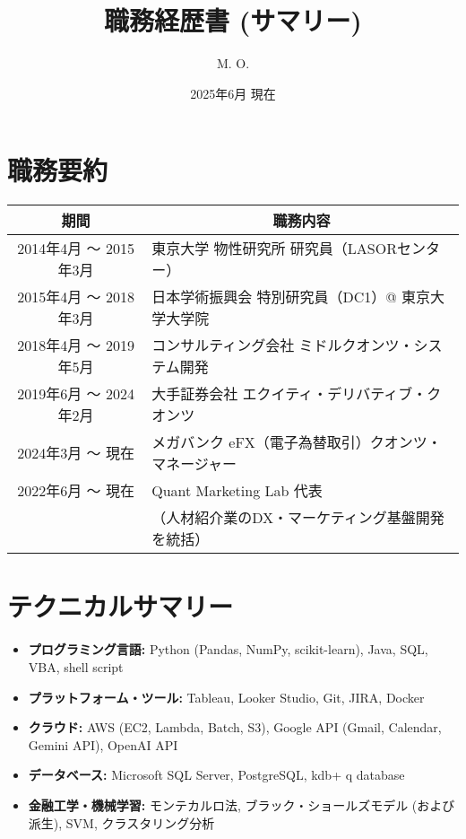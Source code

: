 \documentclass[uplatex,a4j,10.5pt,dvipdfmx]{jsarticle}
\title{\sffamily \bfseries 職務経歴書 (サマリー)}
\author{M. O.}
\date{2025年6月 現在}
\begin{document}
\maketitle

\section{職務要約}

\begin{longtable}{|c|p{14cm}|}
	\hline
	\multicolumn{1}{|c|}{\textbf{期間}} & \multicolumn{1}{c|}{\textbf{職務内容}} \\
	\hline
	\endhead

	\hline
	2014年4月 ～ 2015年3月                 & 東京大学 物性研究所 研究員（LASORセンター）          \\
	\hline
	2015年4月 ～ 2018年3月                 & 日本学術振興会 特別研究員（DC1）@ 東京大学大学院        \\
	\hline
	2018年4月 ～ 2019年5月                 & コンサルティング会社 ミドルクオンツ・システム開発          \\
	\hline
	2019年6月 ～ 2024年2月                 & 大手証券会社 エクイティ・デリバティブ・クオンツ           \\
	\hline
	2024年3月 ～ 現在                      & メガバンク eFX（電子為替取引）クオンツ・マネージャー       \\
	\hline
	2022年6月 ～ 現在                      & Quant Marketing Lab 代表             \\
	                                  & （人材紹介業のDX・マーケティング基盤開発を統括）          \\
	\hline
\end{longtable}

\section{テクニカルサマリー}
\begin{itemize}
	\item \textbf{プログラミング言語:} Python (Pandas, NumPy, scikit-learn), Java, SQL, VBA, shell script
	\item \textbf{プラットフォーム・ツール:} Tableau, Looker Studio, Git, JIRA, Docker
	\item \textbf{クラウド:} AWS (EC2, Lambda, Batch, S3), Google API (Gmail, Calendar, Gemini API), OpenAI API
	\item \textbf{データベース:} Microsoft SQL Server, PostgreSQL, kdb+ q database
	\item \textbf{金融工学・機械学習:} モンテカルロ法, ブラック・ショールズモデル (および派生), SVM, クラスタリング分析
\end{itemize}
\end{document}
